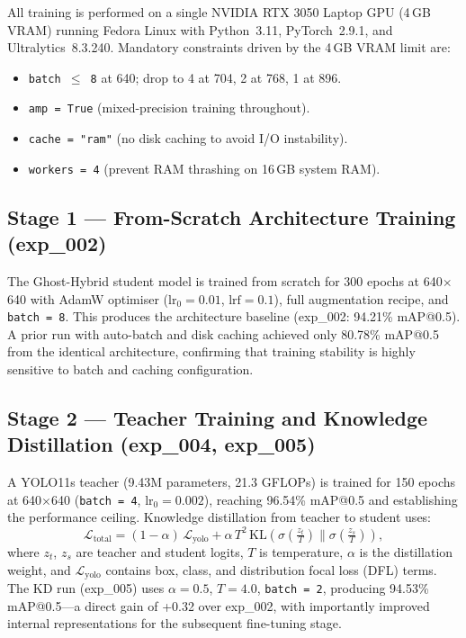 \documentclass[11pt,a4paper]{article}
\begin{document}
All training is performed on a single NVIDIA RTX 3050 Laptop GPU (4\,GB VRAM) running
Fedora Linux with Python~3.11, PyTorch~2.9.1, and Ultralytics~8.3.240. Mandatory
constraints driven by the 4\,GB VRAM limit are:
\begin{itemize}[leftmargin=2em]
  \item \texttt{batch $\leq$ 8} at 640; drop to 4 at 704, 2 at 768, 1 at 896.
  \item \texttt{amp = True} (mixed-precision training throughout).
  \item \texttt{cache = "ram"} (no disk caching to avoid I/O instability).
  \item \texttt{workers = 4} (prevent RAM thrashing on 16\,GB system RAM).
\end{itemize}

\subsection{Stage 1 --- From-Scratch Architecture Training (exp\_002)}

The Ghost-Hybrid student model is trained from scratch for 300 epochs at
640$\times$640 with AdamW optimiser ($\text{lr}_0 = 0.01$, $\text{lrf} = 0.1$), full
augmentation recipe, and \texttt{batch = 8}. This produces the architecture baseline
(exp\_002: 94.21\% mAP@0.5). A prior run with auto-batch and disk caching achieved only
80.78\% mAP@0.5 from the identical architecture, confirming that training stability is
highly sensitive to batch and caching configuration.

\subsection{Stage 2 --- Teacher Training and Knowledge Distillation (exp\_004, exp\_005)}

A YOLO11s teacher (9.43M parameters, 21.3 GFLOPs) is trained for 150 epochs at
640$\times$640 (\texttt{batch = 4}, $\text{lr}_0 = 0.002$), reaching 96.54\% mAP@0.5
and establishing the performance ceiling. Knowledge distillation from teacher to student
uses:
\begin{equation}
  \mathcal{L}_{\mathrm{total}}
    = (1-\alpha)\,\mathcal{L}_{\mathrm{yolo}}
      + \alpha\,T^2\,\mathrm{KL}\!\left(
          \sigma\!\left(\tfrac{z_t}{T}\right)
          \Big\|
          \sigma\!\left(\tfrac{z_s}{T}\right)
        \right),
\end{equation}
where $z_t$, $z_s$ are teacher and student logits, $T$ is temperature, $\alpha$ is the
distillation weight, and $\mathcal{L}_{\mathrm{yolo}}$ contains box, class, and
distribution focal loss (DFL) terms. The KD run (exp\_005) uses $\alpha = 0.5$,
$T = 4.0$, \texttt{batch = 2}, producing 94.53\% mAP@0.5---a direct gain of +0.32 over
exp\_002, with importantly improved internal representations for the subsequent
fine-tuning stage.
\end{document}
